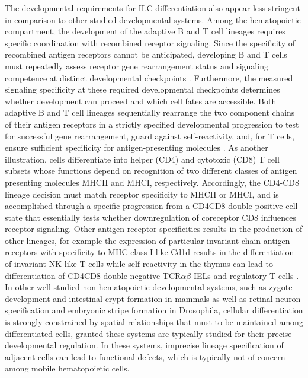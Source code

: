 The developmental requirements for ILC differentiation also appear less stringent in comparison to other studied developmental systems. Among the hematopoietic compartment, the development of the adaptive B and T cell lineages requires specific coordination with recombined receptor signaling. Since the specificity of recombined antigen receptors cannot be anticipated, developing B and T cells must repeatedly assess receptor gene rearrangement status and signaling competence at distinct developmental checkpoints \cite{rothenberg2014}. Furthermore, the measured signaling specificity at these required developmental checkpoints determines whether development can proceed and which cell fates are accessible. Both adaptive B and T cell lineages sequentially rearrange the two component chains of their antigen receptors in a strictly specified developmental progression to test for successful gene rearrangement, guard against self-reactivity, and, for T cells, ensure sufficient specificity for antigen-presenting molecules \cite{melchers2015,carpenter2010}. As another illustration, \abT cells differentiate into helper (CD4\UP) and cytotoxic (CD8\UP) T cell subsets whose functions depend on recognition of two different classes of antigen presenting molecules MHCII and MHCI, respectively. Accordingly, the CD4-CD8 lineage decision must match receptor specificity to MHCII or MHCI, and is accomplished through a specific progression from a CD4\UP CD8\UP{} double-positive cell state that essentially tests whether downregulation of coreceptor CD8 influences receptor signaling. Other antigen receptor specificities results in the production of other lineages, for example the expression of particular invariant chain antigen receptors with specificity to MHC class I-like Cd1d results in the differentiation of invariant NK-like T cells \cite{egawa2005} while self-reactivity in the thymus can lead to differentiation of CD4\UM CD8\UM{} double-negative TCR$\alpha\beta$ IELs and regulatory T cells \cite{mcdonald2014,stritesky2012}. In other well-studied non-hematopoietic developmental systems, such as zygote development and intestinal crypt formation in mammals as well as retinal neuron specification and embryonic stripe formation in Drosophila, cellular differentiation is strongly constrained by spatial relationships that must to be maintained among differentiated cells, granted these systems are typically studied for their precise developmental regulation. In these systems, imprecise lineage specification of adjacent cells can lead to functional defects, which is typically not of concern among mobile hematopoietic cells.

